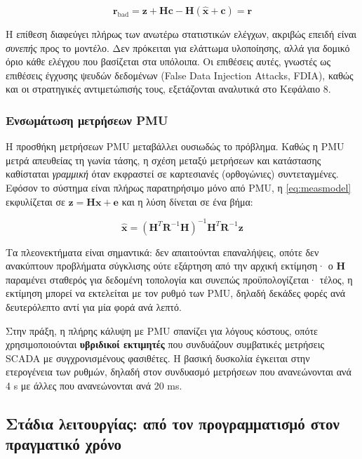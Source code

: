 \begin{equation}
\mathbf{r}_{\text{bad}} = \mathbf{z} + \mathbf{H}\mathbf{c}
        - \mathbf{H}(\hat{\mathbf{x}} + \mathbf{c}) = \mathbf{r}
\label{eq:fdia}
\end{equation}

Η επίθεση διαφεύγει πλήρως των ανωτέρω στατιστικών ελέγχων, ακριβώς επειδή είναι
\emph{συνεπής} προς το μοντέλο. Δεν πρόκειται για ελάττωμα υλοποίησης, αλλά για δομικό όριο
κάθε ελέγχου που βασίζεται στα υπόλοιπα. Οι επιθέσεις αυτές, γνωστές ως επιθέσεις έγχυσης
ψευδών δεδομένων (False Data Injection Attacks, FDIA), καθώς και οι στρατηγικές
αντιμετώπισής τους, εξετάζονται αναλυτικά στο Κεφάλαιο 8.

\subsubsection*{Ενσωμάτωση μετρήσεων PMU}

Η προσθήκη μετρήσεων PMU μεταβάλλει ουσιωδώς το πρόβλημα. Καθώς η PMU μετρά απευθείας τη
γωνία τάσης, η σχέση μεταξύ μετρήσεων και κατάστασης καθίσταται \emph{γραμμική} όταν
εκφραστεί σε καρτεσιανές (ορθογώνιες) συντεταγμένες. Εφόσον το σύστημα είναι πλήρως παρατηρήσιμο μόνο
από PMU, η \eqref{eq:measmodel} εκφυλίζεται σε
$\mathbf{z} = \mathbf{H}\mathbf{x} + \mathbf{e}$ και η λύση δίνεται σε ένα βήμα:

\begin{equation}
\hat{\mathbf{x}} = \left(\mathbf{H}^{T}\mathbf{R}^{-1}\mathbf{H}\right)^{-1}
                    \mathbf{H}^{T}\mathbf{R}^{-1}\mathbf{z}
\label{eq:linse}
\end{equation}

Τα πλεονεκτήματα είναι σημαντικά: δεν απαιτούνται επαναλήψεις, οπότε δεν ανακύπτουν
προβλήματα σύγκλισης ούτε εξάρτηση από την αρχική εκτίμηση· ο $\mathbf{H}$ παραμένει
σταθερός για δεδομένη τοπολογία και συνεπώς προϋπολογίζεται· τέλος, η εκτίμηση μπορεί να
εκτελείται με τον ρυθμό των PMU, δηλαδή δεκάδες φορές ανά δευτερόλεπτο αντί για μία φορά
ανά λεπτό.

Στην πράξη, η πλήρης κάλυψη με PMU σπανίζει για λόγους κόστους, οπότε χρησιμοποιούνται
\textbf{υβριδικοί εκτιμητές} που συνδυάζουν συμβατικές μετρήσεις SCADA με
συγχρονισμένους φασιθέτες. Η βασική δυσκολία έγκειται στην ετερογένεια των ρυθμών, δηλαδή στον
συνδυασμό μετρήσεων που ανανεώνονται ανά 4 s με άλλες που ανανεώνονται ανά 20 ms.

\subsection{Στάδια λειτουργίας: από τον προγραμματισμό στον πραγματικό χρόνο}

